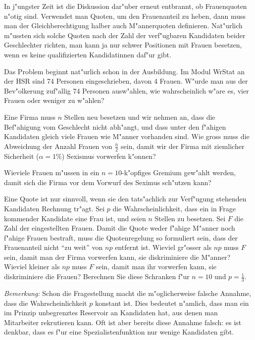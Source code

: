 In j"ungster Zeit ist die Diskussion dar"uber erneut entbrannt,
ob Frauenquoten n"otig sind. Verwendet man Quoten, um den Frauenanteil
zu heben, dann muss man der Gleichberechtigung halber auch M"annerquoten
definieren. Nat"urlich m"ussten sich solche Quoten nach der Zahl der
verf"ugbaren Kandidaten beider Geschlechter richten, man kann ja nur
schwer Positionen mit Frauen besetzen, wenn es keine qualifizierten
Kandidatinnen daf"ur gibt.
\begin{teilaufgaben}
\item Das Problem beginnt nat"urlich schon in der Ausbildung. Im Modul
WrStat an der HSR sind 74 Personen eingeschrieben, davon 4 Frauen.
W"urde man aus
der Bev"olkerung zuf"allig 74 Personen ausw"ahlen, wie wahrscheinlich
w"are es, vier Frauen oder weniger zu w"ahlen?
\item Eine Firma muss $n$ Stellen neu besetzen und wir nehmen an, dass die
Bef"ahigung vom Geschlecht nicht abh"angt,
und dass unter den f"ahigen Kandidaten gleich viele Frauen wie M"anner
vorhanden sind. Wie gross muss die Abweichung der Anzahl Frauen von
$\frac{n}2$ sein, damit wir der Firma mit ziemlicher Sicherheit ($\alpha=1\%$)
Sexismus vorwerfen k"onnen?
\item
Wieviele Frauen m"ussen in ein $n=10$-k"opfiges
Gremium gew"ahlt werden, damit sich die Firma vor dem Vorwurf des
Seximus sch"utzen kann?
\item Eine Quote ist nur sinnvoll, wenn sie den tats"achlich zur
Verf"ugung stehenden Kandidaten Rechnung tr"agt.
Sei $p$ die Wahrscheinlichkeit, dass ein in Frage kommender Kandidate
eine Frau ist, und seien $n$ Stellen zu besetzen. Sei $F$ die
Zahl der eingestellten Frauen.
Damit die Quote weder f"ahige M"anner noch f"ahige Frauen bestraft,
muss die Quotenregelung so formuliert sein, dass der Frauenanteil nicht
``zu weit'' von $np$ entfernt ist. Wieviel gr"osser als $np$ muss $F$
sein, damit man der Firma vorwerfen kann, sie diskriminiere die M"anner?
Wieviel kleiner als $np$ muss $F$  sein, damit man ihr vorwerfen kann,
sie diskriminiere die Frauen? Berechnen Sie diese Schranken f"ur
$n=10$ und $p=\frac13$.
\end{teilaufgaben}
{\it Bemerkung:} Schon die Fragestellung macht die m"oglicherweise falsche
Annahme, dass die Wahrscheinlichkeit
$p$ konstant ist. Dies bedeutet n"amlich, dass man ein im Prinzip
unbegrenztes Reservoir an Kandidaten hat, aus denen man Mitarbeiter
rekrutieren kann. Oft ist aber bereits diese Annahme falsch: es ist
denkbar, dass es f"ur eine Spezialistenfunktion nur wenige Kandidaten
gibt.

